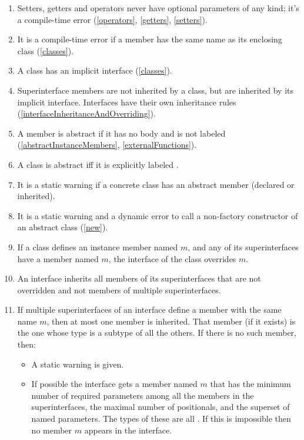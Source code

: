 \documentclass{article}
\begin{document}
{\begin{enumerate}
If two members override each other, it is a static warning if the overriding member does not have all the named parameters that the overridden one has (\ref{instanceMethods}).
\item Setters, getters and operators never have optional parameters of any kind; it's a compile-time error (\ref{operators}, \ref{getters}, \ref{setters}).
\item It is a compile-time error if a member has the same name as its enclosing class (\ref{classes}).
\item A class has an implicit interface (\ref{classes}).
\item Superinterface members are not inherited by a class, but are inherited by its implicit interface.
Interfaces have their own inheritance rules (\ref{interfaceInheritanceAndOverriding}).
\item A member is abstract if it has no body and is not labeled \EXTERNAL{} (\ref{abstractInstanceMembers}, \ref{externalFunctions}).
\item A class is abstract if{}f it is explicitly labeled \ABSTRACT{}.%
\item It is a static warning if a concrete class has an abstract member (declared or inherited).
\item It is a static warning and a dynamic error to call a non-factory constructor of an abstract class (\ref{new}).
\item If a class defines an instance member named $m$, and any of its superinterfaces have a member named $m$, the interface of the class overrides $m$.
\item An interface inherits all members of its superinterfaces that are not overridden and not members of multiple superinterfaces.
\item If multiple superinterfaces of an interface define a member with the same name $m$, then at most one member is inherited.
That member (if it exists) is the one whose type is a subtype of all the others.
If there is no such member, then:
\begin{itemize}
\item A static warning is given.
\item If possible the interface gets a member named $m$ that has the minimum number of required parameters among all the members in the superinterfaces, the maximal number of positionals, and the superset of named parameters.
The types of these are all \DYNAMIC{}.
If this is impossible then no member $m$ appears in the interface.

\end{itemize}
\end{enumerate}}
\end{document}
